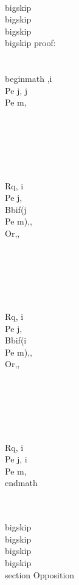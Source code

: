 \\bigskip
\\bigskip
\\bigskip
\\bigskip
proof:\\\\
\\begin{math} 
,i \\Pe j, j \\Pe m,\\\\\\\\\\\\
\\Rq, i \\Pe j, \\Bb{if(j \\Pe m)}{,}{, \\Or,}, \\\\\\\\\\\\
\\Rq, i \\Pe j, \\Bb{if(i \\Pe m)}{,}{, \\Or,},  \\\\\\\\\\\\
\\Rq, i \\Pe j, i \\Pe m,
\\end{math}

\\[,i \\Pe j, j \\nPe m, \\Rq , i \\Pe j, i \\nPe m,\\]




\\bigskip
\\bigskip
\\bigskip
\\bigskip
\\section{ Opposition}
\\[,i \\Pe j, i \\nPe j, \\Rq , \\Or,\\]


